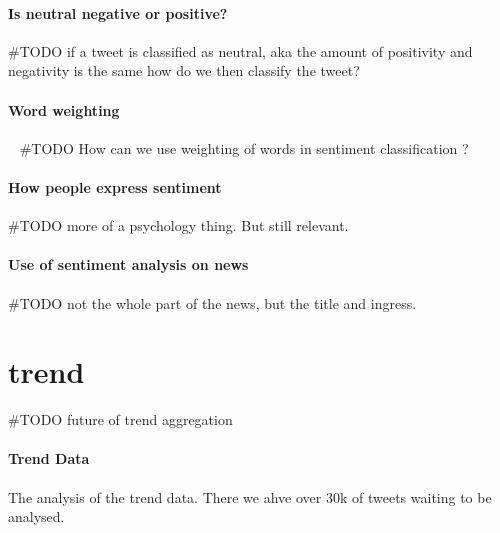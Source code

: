 \paragraph{Is neutral negative or positive?}
#TODO if a tweet is classified as neutral, aka the amount of positivity and
negativity is the same how do we then classify the tweet?

\paragraph{Word weighting} 
#TODO How can we use weighting of words in sentiment classification ?

\paragraph{How people express sentiment}
#TODO more of a psychology thing. But still relevant. 

\paragraph{Use of sentiment analysis on news}
#TODO not the whole part of the news, but the title and ingress. 
%

\section{trend}
#TODO future of trend aggregation

\paragraph{Trend Data}
The analysis of the trend data. There we ahve over 30k of tweets waiting to be
analysed.
%
